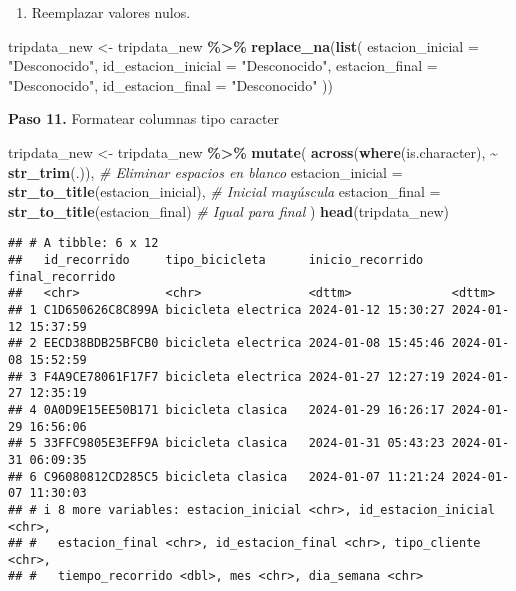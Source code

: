 \documentclass[
]{article}
\newenvironment{Shaded}{\begin{snugshade}}{\end{snugshade}}
\newcommand{\AttributeTok}[1]{\textcolor[rgb]{0.13,0.29,0.53}{#1}}
\newcommand{\CommentTok}[1]{\textcolor[rgb]{0.56,0.35,0.01}{\textit{#1}}}
\newcommand{\FunctionTok}[1]{\textcolor[rgb]{0.13,0.29,0.53}{\textbf{#1}}}
\newcommand{\NormalTok}[1]{#1}
\newcommand{\OtherTok}[1]{\textcolor[rgb]{0.56,0.35,0.01}{#1}}
\newcommand{\SpecialCharTok}[1]{\textcolor[rgb]{0.81,0.36,0.00}{\textbf{#1}}}
\newcommand{\StringTok}[1]{\textcolor[rgb]{0.31,0.60,0.02}{#1}}
\providecommand{\tightlist}{%
  \setlength{\itemsep}{0pt}\setlength{\parskip}{0pt}}
\begin{document}
\begin{enumerate}
\def\labelenumi{\arabic{enumi}.}
\setcounter{enumi}{1}
\tightlist
\item
  Reemplazar valores nulos.
\end{enumerate}

\begin{Shaded}
\begin{Highlighting}[]
\NormalTok{    tripdata\_new }\OtherTok{\textless{}{-}}\NormalTok{ tripdata\_new }\SpecialCharTok{\%\textgreater{}\%}
      \FunctionTok{replace\_na}\NormalTok{(}\FunctionTok{list}\NormalTok{(}
        \AttributeTok{estacion\_inicial =} \StringTok{"Desconocido"}\NormalTok{,}
        \AttributeTok{id\_estacion\_inicial =} \StringTok{"Desconocido"}\NormalTok{,}
        \AttributeTok{estacion\_final =} \StringTok{"Desconocido"}\NormalTok{,}
        \AttributeTok{id\_estacion\_final =} \StringTok{"Desconocido"}
\NormalTok{      ))}
\end{Highlighting}
\end{Shaded}

\hfill\break
\textbf{Paso 11.} Formatear columnas tipo caracter

\begin{Shaded}
\begin{Highlighting}[]
\NormalTok{tripdata\_new }\OtherTok{\textless{}{-}}\NormalTok{ tripdata\_new }\SpecialCharTok{\%\textgreater{}\%}
  \FunctionTok{mutate}\NormalTok{(}
    \FunctionTok{across}\NormalTok{(}\FunctionTok{where}\NormalTok{(is.character), }\SpecialCharTok{\textasciitilde{}} \FunctionTok{str\_trim}\NormalTok{(.)),       }\CommentTok{\# Eliminar espacios en blanco}
    \AttributeTok{estacion\_inicial =} \FunctionTok{str\_to\_title}\NormalTok{(estacion\_inicial),  }\CommentTok{\# Inicial mayúscula}
    \AttributeTok{estacion\_final =} \FunctionTok{str\_to\_title}\NormalTok{(estacion\_final)     }\CommentTok{\# Igual para final}
\NormalTok{  )}
\FunctionTok{head}\NormalTok{(tripdata\_new)}
\end{Highlighting}
\end{Shaded}

\begin{verbatim}
## # A tibble: 6 x 12
##   id_recorrido     tipo_bicicleta      inicio_recorrido    final_recorrido    
##   <chr>            <chr>               <dttm>              <dttm>             
## 1 C1D650626C8C899A bicicleta electrica 2024-01-12 15:30:27 2024-01-12 15:37:59
## 2 EECD38BDB25BFCB0 bicicleta electrica 2024-01-08 15:45:46 2024-01-08 15:52:59
## 3 F4A9CE78061F17F7 bicicleta electrica 2024-01-27 12:27:19 2024-01-27 12:35:19
## 4 0A0D9E15EE50B171 bicicleta clasica   2024-01-29 16:26:17 2024-01-29 16:56:06
## 5 33FFC9805E3EFF9A bicicleta clasica   2024-01-31 05:43:23 2024-01-31 06:09:35
## 6 C96080812CD285C5 bicicleta clasica   2024-01-07 11:21:24 2024-01-07 11:30:03
## # i 8 more variables: estacion_inicial <chr>, id_estacion_inicial <chr>,
## #   estacion_final <chr>, id_estacion_final <chr>, tipo_cliente <chr>,
## #   tiempo_recorrido <dbl>, mes <chr>, dia_semana <chr>
\end{verbatim}
\end{document}

